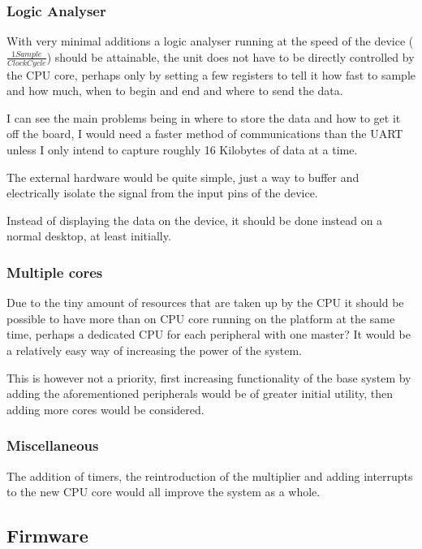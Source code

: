 \documentclass	[a4paper, 10pt]	{article}
\begin{document}
      \subsubsection{Logic Analyser}

      With very minimal additions a logic analyser running at the speed of the device
      ($\frac{1 Sample}{Clock Cycle}$) should be attainable, the unit does not have
      to be directly controlled by the CPU core, perhaps only by setting a few registers
      to tell it how fast to sample and how much, when to begin and end and where to
      send the data.

      I can see the main problems being in where to store the data and how to get it
      off the board, I would need a faster method of communications than the UART
      unless I only intend to capture roughly 16 Kilobytes of data at a time.

      The external hardware would be quite simple, just a way to buffer and electrically
      isolate the signal from the input pins of the device.

      Instead of displaying the data on the device, it should be done instead on a
      normal desktop, at least initially.

      \subsubsection{Multiple cores}

      Due to the tiny amount of resources that are taken up by the CPU it should be
      possible to have more than on CPU core running on the platform at the same
      time, perhaps a dedicated CPU for each peripheral with one master? It would
      be a relatively easy way of increasing the power of the system.

      This is however not a priority, first increasing functionality of the base
      system by adding the aforementioned peripherals would be of greater initial
      utility, then adding more cores would be considered.

      \subsubsection{Miscellaneous}
      
      The addition of timers, the reintroduction of the multiplier and adding 
      interrupts to the new CPU core would all improve the system as a whole.

    \subsection{Firmware}
\end{document}

